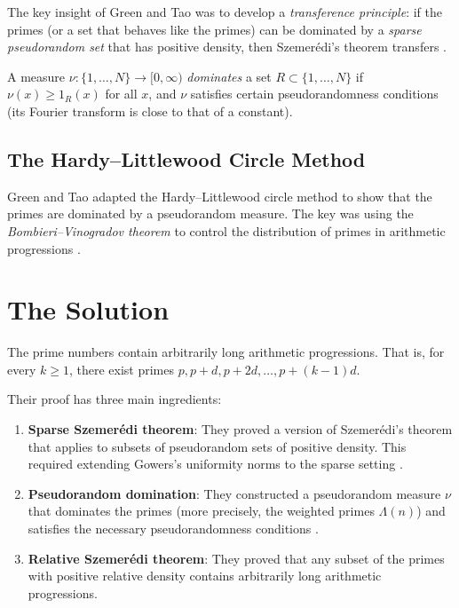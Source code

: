 The key insight of Green and Tao was to develop a \emph{transference principle}: if the primes (or a set that behaves like the primes) can be dominated by a \emph{sparse pseudorandom set} that has positive density, then Szemer\'edi's theorem transfers \cite{greentao2008}.

\begin{definition}
A measure $\nu: \{1, \ldots, N\} \to [0, \infty)$ \emph{dominates} a set $R \subset \{1, \ldots, N\}$ if $\nu(x) \geq 1_R(x)$ for all $x$, and $\nu$ satisfies certain pseudorandomness conditions (its Fourier transform is close to that of a constant).
\end{definition}

\subsection{The Hardy--Littlewood Circle Method}

Green and Tao adapted the Hardy--Littlewood circle method to show that the primes are dominated by a pseudorandom measure. The key was using the \emph{Bombieri--Vinogradov theorem} to control the distribution of primes in arithmetic progressions \cite{bombieri1965}.

\section{The Solution}

\begin{theorem}
The prime numbers contain arbitrarily long arithmetic progressions. That is, for every $k \geq 1$, there exist primes $p, p+d, p+2d, \ldots, p+(k-1)d$.
\end{theorem}

Their proof has three main ingredients:

\begin{enumerate}
\item \textbf{Sparse Szemer\'edi theorem}: They proved a version of Szemer\'edi's theorem that applies to subsets of pseudorandom sets of positive density. This required extending Gowers's uniformity norms to the sparse setting \cite{gowers2001}.
\item \textbf{Pseudorandom domination}: They constructed a pseudorandom measure $\nu$ that dominates the primes (more precisely, the weighted primes $\Lambda(n)$) and satisfies the necessary pseudorandomness conditions \cite{greentao2008}.
\item \textbf{Relative Szemer\'edi theorem}: They proved that any subset of the primes with positive relative density contains arbitrarily long arithmetic progressions.
\end{enumerate}

